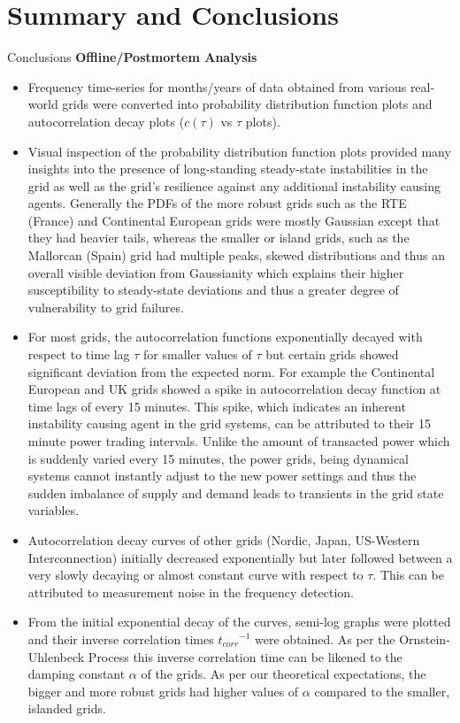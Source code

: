 \section[Conclusions]{Summary and Conclusions}
\label{sec:concl}

\begin{frame}[allowframebreaks]{Conclusions}
	\noindent\textbf{Offline/Postmortem Analysis}
	\begin{itemize}
		\item Frequency time-series for months/years of data obtained from various real-world grids were converted into probability distribution function plots and autocorrelation decay plots ($c(\tau)$ vs $\tau$ plots).
		\item Visual inspection of the probability distribution function plots provided many insights into the presence of long-standing steady-state instabilities in the grid as well as the grid's resilience against any additional instability causing agents. Generally the PDFs of the more robust grids such as the RTE (France) and Continental European grids were mostly Gaussian except that they had heavier tails, whereas the smaller or island grids, such as the Mallorcan (Spain) grid had multiple peaks, skewed distributions and thus an overall visible deviation from Gaussianity which explains their higher susceptibility to steady-state deviations and thus a greater degree of vulnerability to grid failures. 
		\item For most grids, the autocorrelation functions exponentially decayed with respect to time lag $\tau$ for smaller values of $\tau$ but certain grids showed significant deviation from the expected norm. For example the Continental European and UK grids showed a spike in autocorrelation decay function at time lags of every 15 minutes. This spike, which indicates an inherent instability causing agent in the grid systems, can be attributed to their 15 minute power trading intervals. Unlike the amount of transacted power which is suddenly varied every 15 minutes, the power grids, being dynamical systems cannot instantly adjust to the new power settings and thus the sudden imbalance of supply and demand leads to transients in the grid state variables.
		\item Autocorrelation decay curves of other grids (Nordic, Japan, US-Western Interconnection) initially decreased exponentially but later followed between a very slowly decaying or almost constant curve with respect to $\tau$. This can be attributed to measurement noise in the frequency detection.
		\item From the initial exponential decay of the curves, semi-log graphs were plotted and their inverse correlation times ${t_{corr}}^{-1}$ were obtained. As per the Ornstein-Uhlenbeck Process this inverse correlation time can be likened to the damping constant $\alpha$ of the grids. As per our theoretical expectations, the bigger and more robust grids had higher values of $\alpha$ compared to the smaller, islanded grids.
	\end{itemize}
\end{frame}

